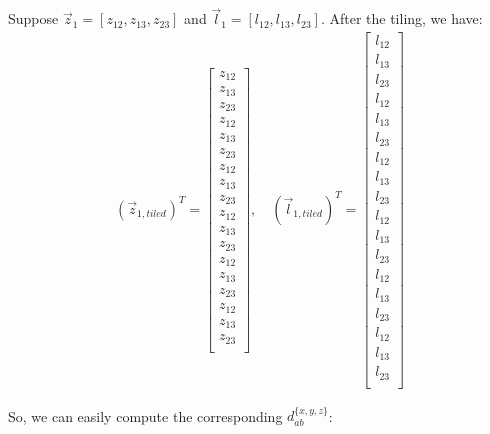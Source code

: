 \documentclass{article}
\begin{document}
Suppose $\vec{z}_{1} = [z_{12}, z_{13}, z_{23}]$ and 
$\vec{l}_{1} = [l_{12}, l_{13}, l_{23}]$. After the tiling, we have:
\begin{eqnarray}
\left(\vec{z}_{1, tiled}\right)^T = \left[
	\begin{array}{c}
		z_{12} \\
		z_{13} \\
		z_{23} \\
		z_{12} \\
		z_{13} \\
		z_{23} \\
		z_{12} \\
		z_{13} \\
		z_{23} \\
		z_{12} \\
		z_{13} \\
		z_{23} \\
		z_{12} \\
		z_{13} \\
		z_{23} \\
		z_{12} \\
		z_{13} \\
		z_{23} \\
	\end{array}
\right]
, \quad
\left(\vec{l}_{1, tiled}\right)^T = \left[
	\begin{array}{c}
		l_{12} \\
		l_{13} \\
		l_{23} \\
		l_{12} \\
		l_{13} \\
		l_{23} \\
		l_{12} \\
		l_{13} \\
		l_{23} \\
		l_{12} \\
		l_{13} \\
		l_{23} \\
		l_{12} \\
		l_{13} \\
		l_{23} \\
		l_{12} \\
		l_{13} \\
		l_{23} \\
	\end{array}
\right]
\end{eqnarray}

\noindent So, we can easily compute the corresponding $d^{\{ x,y,z \}}_{ab}$:
\end{document}
